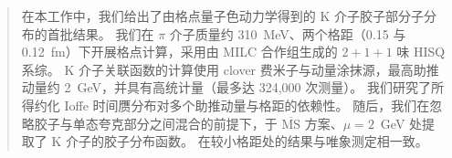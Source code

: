 \begin{abstract}
在本工作中，我们给出了由格点量子色动力学得到的 K 介子胶子部分子分布的首批结果。
我们在 $\pi$ 介子质量约 310~MeV、两个格距（0.15 与 0.12~fm）下开展格点计算，采用由 MILC 合作组生成的 $2+1+1$ 味 HISQ 系综。
K 介子关联函数的计算使用 clover 费米子与动量涂抹源，最高助推动量约 2~GeV，并具有高统计量（最多达 324,000 次测量）。
我们研究了所得约化 Ioffe 时间赝分布对多个助推动量与格距的依赖性。
随后，我们在忽略胶子与单态夸克部分之间混合的前提下，于 $\overline{\text{MS}}$ 方案、$\mu = 2$~GeV 处提取了 K 介子的胶子分布函数。
在较小格距处的结果与唯象测定相一致。
\end{abstract}
